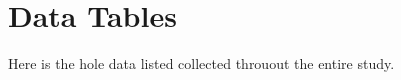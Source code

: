 \section{Data Tables}
Here is the hole data listed collected throuout the entire study.

\begin{comment}
    \section{Appendix Section Test}
    Test: \autoref{tab:moreexample} (This reference should have a
    lowercase, small caps \spacedlowsmallcaps{A} if the option
    \texttt{floatperchapter} is activated, just as in the table itself
     $\rightarrow$ however, this does not work at the moment.)

    \begin{table}[h]
        \myfloatalign
      \begin{tabularx}{\textwidth}{Xll} \toprule
        \tableheadline{labitur bonorum pri no} & \tableheadline{que vista}
        & \tableheadline{human} \\ \midrule
        fastidii ea ius & germano &  demonstratea \\
        suscipit instructior & titulo & personas \\
        \midrule
        quaestio philosophia & facto & demonstrated \\
        \bottomrule
      \end{tabularx}
      \caption[Autem usu id]{Autem usu id.}
      \label{tab:moreexample}
    \end{table}

    \section{Another Appendix Section Test}
    Equidem detraxit cu nam, vix eu delenit periculis. Eos ut vero
    constituto, no vidit propriae complectitur sea. Diceret nonummy in
    has, no qui eligendi recteque consetetur. Mel eu dictas suscipiantur,
    et sed placerat oporteat. At ipsum electram mei, ad aeque atomorum
    mea. There is also a useless Pascal listing below: \autoref{lst:useless}.

    \begin{lstlisting}[float=b,language=Pascal,frame=tb,caption={A floating example (\texttt{listings} manual)},label=lst:useless]
    for i:=maxint downto 0 do
    begin
    { do nothing }
    end;
    \end{lstlisting}
\end{comment}
